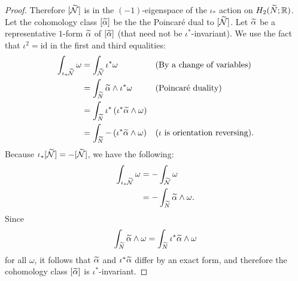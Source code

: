 \begin{proof}
  Therefore $[\widetilde{\mathcal{N}}]$ is in the $(-1)$-eigenspace of the $\iota_{\ast}$ action on $H_2(\widetilde{N}; \mathbb{R})$.
  Let the cohomology class $[\widetilde{\alpha}]$ be the the Poincar\'e dual to $[\widetilde{\mathcal{N}}]$.
  Let $\widetilde{\alpha}$ be a representative $1$-form $\widetilde{\alpha}$ of $[\widetilde{\alpha}]$ (that need not be $\iota^{\ast}$-invariant).
  We use the fact that $\iota^2= \mathrm{id}$ in the first and third equalities:
  \begin{align*}
    \int_{\iota_{\ast}\widetilde{\mathcal{N}}} \omega &= \int_{\widetilde{\mathcal{N}}} \iota^{\ast}\omega &&\text{(By a change of variables)} \\
                                     &= \int_{\widetilde{N}} \widetilde{\alpha} \wedge \iota^{\ast} \omega &&\text{(Poincar\'e duality)} \\
                                     &=\int_{\widetilde{N}} \iota^{\ast} \left( \iota^{\ast}\widetilde{\alpha} \wedge \omega \right) \\
    &= \int_{\widetilde{N}} - \left( \iota^{\ast} \widetilde{\alpha} \wedge \omega \right) &&\text{($\iota$ is orientation reversing)}.
  \end{align*}
  Because $\iota_{\ast}[\widetilde{\mathcal{N}}] = -[\widetilde{\mathcal{N}}]$, we have the following:
  \begin{align*}
    \int_{\iota_{\ast}\widetilde{\mathcal{N}}} \omega &= - \int_{\widetilde{\mathcal{N}}} \omega \\
                              &= - \int_{\widetilde{N}} \widetilde{\alpha} \wedge \omega.
  \end{align*}
  Since $$\int_{\widetilde{N}}\widetilde{\alpha}\wedge\omega=\int_{\widetilde{N}}\iota^\ast\widetilde{\alpha}\wedge\omega$$ for all $\omega$, it follows that $\widetilde{\alpha}$ and $\iota^{\ast}\widetilde{\alpha}$ differ by an exact form, and therefore the cohomology class $[\widetilde{\alpha}]$ is
  $\iota^{\ast}$-invariant.
\end{proof}

